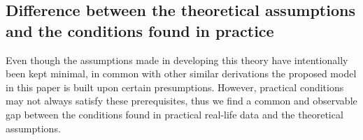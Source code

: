 \documentclass[journal]{IEEEtran}
\begin{document}

\subsection{Difference between the theoretical assumptions and the conditions found in practice}  
\label{sec:improve_the_match_bw_theory_practice}

Even though the assumptions made in developing this theory have intentionally been kept minimal, 
in common with other similar derivations the proposed model in this paper is built upon certain presumptions.
However, practical conditions may not always satisfy these prerequisites, thus we find a common and observable gap between the conditions found in practical real-life data and the theoretical assumptions.
\end{document}
